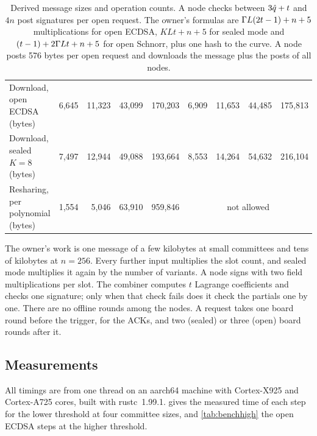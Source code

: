 \begin{table}[t]
\begin{tabular}{@{}l rrrr @{\quad} rrrr@{}}
Download, open ECDSA (bytes) & 6{,}645 & 11{,}323 & 43{,}099 & 170{,}203 & 6{,}909 & 11{,}653 & 44{,}485 & 175{,}813 \\
Download, sealed $K = 8$ (bytes) & 7{,}497 & 12{,}944 & 49{,}088 & 193{,}664 & 8{,}553 & 14{,}264 & 54{,}632 & 216{,}104 \\
Resharing, per polynomial (bytes) & 1{,}554 & 5{,}046 & 63{,}910 & 959{,}846 & \multicolumn{4}{c}{not allowed} \\
\bottomrule
\end{tabular}
\caption{Derived message sizes and operation counts. A node checks between $3\hat{q} + t$ and $4n$ post signatures per open request. The owner's formulas are $\Gamma L(2t-1) + n + 5$ multiplications for open ECDSA, $KLt + n + 5$ for sealed mode and $(t-1) + 2\Gamma L t + n + 5$ for open Schnorr, plus one hash to the curve. A node posts 576 bytes per open request and downloads the message plus the posts of all nodes.}
\label{tab:sizes}
\end{table}

The owner's work is one message of a few kilobytes at small committees and tens of kilobytes at $n = 256$. Every further input multiplies the slot count, and sealed mode multiplies it again by the number of variants. A node signs with two field multiplications per slot. The combiner computes $t$ Lagrange coefficients and checks one signature; only when that check fails does it check the partials one by one. There are no offline rounds among the nodes. A request takes one board round before the trigger, for the ACKs, and two (sealed) or three (open) board rounds after it.

\subsection{Measurements}

All timings are from one thread on an aarch64 machine with Cortex-X925 and Cortex-A725 cores, built with rustc~1.99.1.  gives the measured time of each step for the lower threshold at four committee sizes, and \cref{tab:benchhigh} the open ECDSA steps at the higher threshold.

